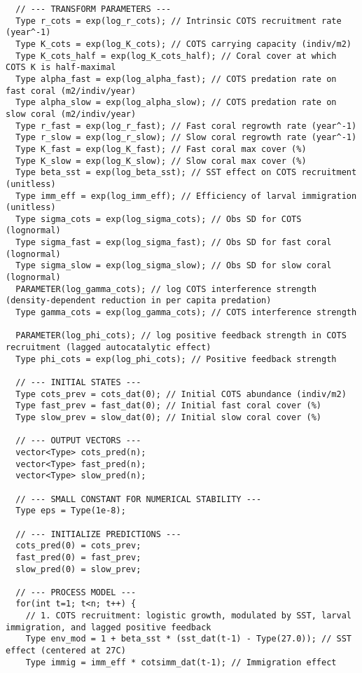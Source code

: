 \begin{lstlisting}
  // --- TRANSFORM PARAMETERS ---
  Type r_cots = exp(log_r_cots); // Intrinsic COTS recruitment rate (year^-1)
  Type K_cots = exp(log_K_cots); // COTS carrying capacity (indiv/m2)
  Type K_cots_half = exp(log_K_cots_half); // Coral cover at which COTS K is half-maximal
  Type alpha_fast = exp(log_alpha_fast); // COTS predation rate on fast coral (m2/indiv/year)
  Type alpha_slow = exp(log_alpha_slow); // COTS predation rate on slow coral (m2/indiv/year)
  Type r_fast = exp(log_r_fast); // Fast coral regrowth rate (year^-1)
  Type r_slow = exp(log_r_slow); // Slow coral regrowth rate (year^-1)
  Type K_fast = exp(log_K_fast); // Fast coral max cover (%)
  Type K_slow = exp(log_K_slow); // Slow coral max cover (%)
  Type beta_sst = exp(log_beta_sst); // SST effect on COTS recruitment (unitless)
  Type imm_eff = exp(log_imm_eff); // Efficiency of larval immigration (unitless)
  Type sigma_cots = exp(log_sigma_cots); // Obs SD for COTS (lognormal)
  Type sigma_fast = exp(log_sigma_fast); // Obs SD for fast coral (lognormal)
  Type sigma_slow = exp(log_sigma_slow); // Obs SD for slow coral (lognormal)
  PARAMETER(log_gamma_cots); // log COTS interference strength (density-dependent reduction in per capita predation)
  Type gamma_cots = exp(log_gamma_cots); // COTS interference strength

  PARAMETER(log_phi_cots); // log positive feedback strength in COTS recruitment (lagged autocatalytic effect)
  Type phi_cots = exp(log_phi_cots); // Positive feedback strength

  // --- INITIAL STATES ---
  Type cots_prev = cots_dat(0); // Initial COTS abundance (indiv/m2)
  Type fast_prev = fast_dat(0); // Initial fast coral cover (%)
  Type slow_prev = slow_dat(0); // Initial slow coral cover (%)

  // --- OUTPUT VECTORS ---
  vector<Type> cots_pred(n);
  vector<Type> fast_pred(n);
  vector<Type> slow_pred(n);

  // --- SMALL CONSTANT FOR NUMERICAL STABILITY ---
  Type eps = Type(1e-8);

  // --- INITIALIZE PREDICTIONS ---
  cots_pred(0) = cots_prev;
  fast_pred(0) = fast_prev;
  slow_pred(0) = slow_prev;

  // --- PROCESS MODEL ---
  for(int t=1; t<n; t++) {
    // 1. COTS recruitment: logistic growth, modulated by SST, larval immigration, and lagged positive feedback
    Type env_mod = 1 + beta_sst * (sst_dat(t-1) - Type(27.0)); // SST effect (centered at 27C)
    Type immig = imm_eff * cotsimm_dat(t-1); // Immigration effect


\end{lstlisting}
